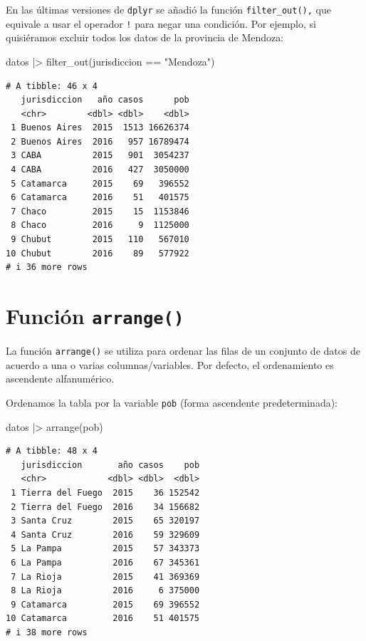 \documentclass[
  spanish,
  a4paper,
]{scrbook}
\newenvironment{Shaded}{\begin{snugshade}}{\end{snugshade}}
\newcommand{\FunctionTok}[1]{\textcolor[rgb]{0.28,0.35,0.67}{#1}}
\newcommand{\NormalTok}[1]{\textcolor[rgb]{0.00,0.23,0.31}{#1}}
\newcommand{\SpecialCharTok}[1]{\textcolor[rgb]{0.37,0.37,0.37}{#1}}
\newcommand{\StringTok}[1]{\textcolor[rgb]{0.13,0.47,0.30}{#1}}
\begin{document}
En las últimas versiones de \texttt{dplyr} se añadió la función
\texttt{filter\_out(),} que equivale a usar el operador \texttt{!} para
negar una condición. Por ejemplo, si quisiéramos excluir todos los datos
de la provincia de Mendoza:

\begin{Shaded}
\begin{Highlighting}[]
\NormalTok{datos }\SpecialCharTok{|\textgreater{}}
  \FunctionTok{filter\_out}\NormalTok{(jurisdiccion }\SpecialCharTok{==} \StringTok{"Mendoza"}\NormalTok{)}
\end{Highlighting}
\end{Shaded}

\begin{verbatim}
# A tibble: 46 x 4
   jurisdiccion   año casos      pob
   <chr>        <dbl> <dbl>    <dbl>
 1 Buenos Aires  2015  1513 16626374
 2 Buenos Aires  2016   957 16789474
 3 CABA          2015   901  3054237
 4 CABA          2016   427  3050000
 5 Catamarca     2015    69   396552
 6 Catamarca     2016    51   401575
 7 Chaco         2015    15  1153846
 8 Chaco         2016     9  1125000
 9 Chubut        2015   110   567010
10 Chubut        2016    89   577922
# i 36 more rows
\end{verbatim}

\section{\texorpdfstring{Función
\texttt{arrange()}}{Función arrange()}}\label{funciuxf3n-arrange}

La función \texttt{arrange()} se utiliza para ordenar las filas de un
conjunto de datos de acuerdo a una o varias columnas/variables. Por
defecto, el ordenamiento es ascendente alfanumérico.

Ordenamos la tabla por la variable \texttt{pob} (forma ascendente
predeterminada):

\begin{Shaded}
\begin{Highlighting}[]
\NormalTok{datos }\SpecialCharTok{|\textgreater{}}
  \FunctionTok{arrange}\NormalTok{(pob)}
\end{Highlighting}
\end{Shaded}

\begin{verbatim}
# A tibble: 48 x 4
   jurisdiccion       año casos    pob
   <chr>            <dbl> <dbl>  <dbl>
 1 Tierra del Fuego  2015    36 152542
 2 Tierra del Fuego  2016    34 156682
 3 Santa Cruz        2015    65 320197
 4 Santa Cruz        2016    59 329609
 5 La Pampa          2015    57 343373
 6 La Pampa          2016    67 345361
 7 La Rioja          2015    41 369369
 8 La Rioja          2016     6 375000
 9 Catamarca         2015    69 396552
10 Catamarca         2016    51 401575
# i 38 more rows
\end{verbatim}
\end{document}

